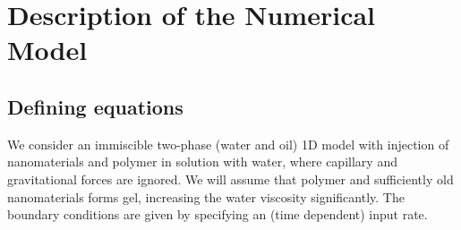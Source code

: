 \documentclass[nanomaterials,article,submit,moreauthors,pdftex]{Definitions/mdpi}
\begin{document}



\appendix
\section{Description of the Numerical Model}
\unskip
\subsection{Defining equations}
We consider an immiscible two-phase (water and oil) 1D model with injection of nanomaterials and polymer in solution with water, where capillary and gravitational forces are ignored. We will assume that polymer and sufficiently old nanomaterials forms gel, increasing the water viscosity significantly. The boundary conditions are given by specifying an (time dependent) input rate. 
\end{document}
